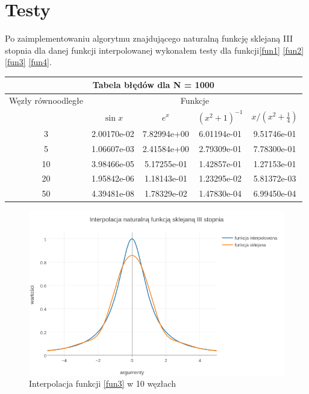\documentclass{article}
\begin{document}
\section{Testy}
Po zaimplementowaniu algorytmu znajdującego naturalną funkcję sklejaną III stopnia dla danej funkcji interpolowanej wykonałem testy dla funkcji\eqref{fun1} \eqref{fun2} \eqref{fun3} \eqref{fun4}.

\renewcommand{\arraystretch}{1.5}  
\begin{center}
	\begin{tabular}{||c||c|c|c|c||} \hline
		\multicolumn{5}{||c||}{Tabela błędów dla N = 1000} \\ \hline
		Węzły równoodległe 	& \multicolumn{4}{|c||}{Funkcje} \\ \cline{2-5}
		& $\sin x$ & $e^x$ & $(x^{2}+1)^{-1}$ & $x/(x^{2} + \frac{1}{4})$ \\ \hline					
		3 		& 2.00170e-02 &  7.82994e+00 &  6.01194e-01 & 9.51746e-01 \\ \hline
		5 		& 1.06607e-03 &  2.41584e+00 &  2.79309e-01 & 7.78300e-01 \\ \hline
		10  	& 3.98466e-05 &  5.17255e-01 &  1.42857e-01 & 1.27153e-01 \\ \hline
		20  	& 1.95842e-06 &  1.18143e-01 &  1.23295e-02 & 5.81372e-03 \\ \hline
		50  	& 4.39481e-08 &  1.78329e-02 &  1.47830e-04 & 6.99450e-04 \\ \hline
	\end{tabular}
\end{center}
\renewcommand{\arraystretch}{1}

\begin{figure}[ht]
	\begin{center}
		\includegraphics[width=13cm]{spline_c}
	\end{center}
	\caption{Interpolacja funkcji \eqref{fun3} w 10 węzłach}
	\label{fig:rysunek3}
\end{figure}
\end{document}
